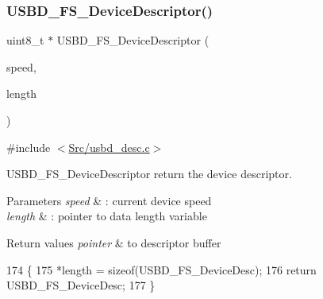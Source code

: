 \subsubsection{\texorpdfstring{U\+S\+B\+D\+\_\+\+F\+S\+\_\+\+Device\+Descriptor()}{USBD\_FS\_DeviceDescriptor()}}
{\footnotesize\ttfamily uint8\+\_\+t $\ast$ U\+S\+B\+D\+\_\+\+F\+S\+\_\+\+Device\+Descriptor (\begin{DoxyParamCaption}\item[{U\+S\+B\+D\+\_\+\+Speed\+Type\+Def}]{speed,  }\item[{uint16\+\_\+t $\ast$}]{length }\end{DoxyParamCaption})}



{\ttfamily \#include $<$\mbox{\hyperlink{usbd__desc_8c}{Src/usbd\+\_\+desc.\+c}}$>$}



U\+S\+B\+D\+\_\+\+F\+S\+\_\+\+Device\+Descriptor return the device descriptor. 


\begin{DoxyParams}{Parameters}
{\em speed} & \+: current device speed \\
\hline
{\em length} & \+: pointer to data length variable \\
\hline
\end{DoxyParams}

\begin{DoxyRetVals}{Return values}
{\em pointer} & to descriptor buffer \\
\hline
\end{DoxyRetVals}

\begin{DoxyCode}
174 \{
175   *length = \textcolor{keyword}{sizeof}(USBD\_FS\_DeviceDesc);
176   \textcolor{keywordflow}{return} USBD\_FS\_DeviceDesc;
177 \}
\end{DoxyCode}
\mbox{\label{group___u_s_b_d___d_e_s_c___private___functions_gab248f43276f92d982ab5853111e4fb10}} 
